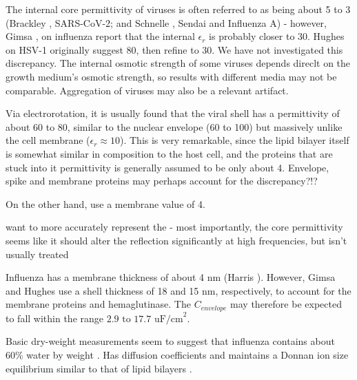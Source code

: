 \documentclass[fleqn,10pt]{paper}
\begin{document}
The internal core permittivity of viruses is often referred to as being about 5 to 3 (Brackley \cite{Electrostatic2020}, SARS-CoV-2; and Schnelle \cite{Trapping1996}, Sendai and Influenza A) - however, Gimsa \cite{New1999}, on influenza report that the internal $\epsilon_r$ is probably closer to 30. Hughes on HSV-1 originally suggest 80\cite{Manipulation1998}, then refine to 30\cite{Dielectrophoretic2001}. We have not investigated this discrepancy. The internal osmotic strength of some viruses depends direclt on the growth medium's osmotic strength\cite{Osmotic2003}, so results with different media may not be comparable. Aggregation of viruses may also be a relevant artifact. 

Via electrorotation, it is usually found that the viral shell has a permittivity of about 60 to 80, similar to the nuclear envelope (60 to 100) but massively unlike the cell membrane ($\epsilon_r\approx 10$). This is very remarkable, since the lipid bilayer itself is somewhat similar in composition to the host cell, and the proteins that are stuck into it permittivity is generally assumed to be only about 4. Envelope, spike and membrane proteins may perhaps account for the discrepancy?!?

On the other hand, \cite{Electrostatic2020a} use a membrane value of 4.

want to more accurately represent the - most importantly, the core permittivity seems like it should alter the reflection significantly at high frequencies, but isn't usually treated 

Influenza has a membrane thickness of about 4 nm (Harris \cite{Influenza2006}). However, Gimsa and Hughes use a shell thickness of 18 and 15 nm, respectively, to account for the membrane proteins and hemaglutinase. The $C_{envelope}$ may therefore be expected to fall within the range $2.9 \text{ to } 17.7 \text{ uF/cm}^2$.

Basic dry-weight measurements seem to suggest that influenza contains about 60\% water by weight \cite{lauffer1944biophysical}. Has diffusion coefficients and maintains a Donnan ion size equilibrium similar to that of lipid bilayers \cite{Effect2015b}.


% 
\end{document}

